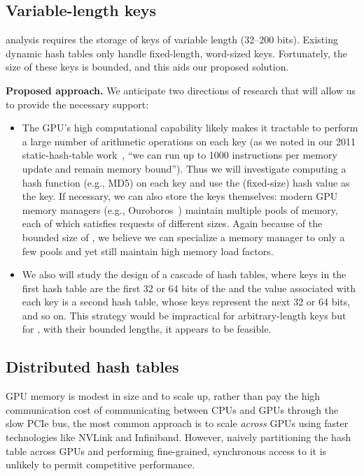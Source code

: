 \subsection{Variable-length keys}

\Kmer analysis requires the storage of \kmer keys of variable length (32--200 bits). Existing dynamic hash tables only handle fixed-length, word-sized keys. Fortunately, the size of these keys is bounded, and this aids our proposed solution.

\noindent
{\bf Proposed approach.}
We anticipate two directions of research that will allow us to provide the necessary support:

\begin{itemize}[noitemsep,nolistsep,leftmargin=*]
  \item The GPU's high computational capability likely makes it tractable to perform a large number of arithmetic operations on each key (as we noted in our 2011 static-hash-table work~\cite{Alcantara:2011:BAE}, ``we can run up to 1000 instructions per memory update and remain memory bound''). Thus we will investigate computing a hash function (e.g., MD5) on each key and use the (fixed-size) hash value as the key. If necessary, we can also store the keys themselves: modern GPU memory managers (e.g., Ouroboros~\cite{Winter:2020:OVQ}) maintain multiple pools of memory, each of which satisfies requests of different sizes. Again because of the bounded size of \kmers, we believe we can specialize a memory manager to only a few pools and yet still maintain high memory load factors.
  \item We also will study the design of a cascade of hash tables, where keys in the first hash table are the first 32 or 64 bits of the \kmer and the value associated with each key is a second hash table, whose keys represent the next 32 or 64 bits, and so on. This strategy would be impractical for arbitrary-length keys but for \kmers, with their bounded lengths, it appears to be feasible.
\end{itemize}

\subsection{Distributed hash tables}

GPU memory is modest in size and to scale up, rather than pay the high communication cost of communicating between CPUs and GPUs through the slow PCIe bus, the most common approach is to scale \emph{across} GPUs using faster technologies like NVLink and Infiniband. However, naively partitioning the hash table across GPUs and performing fine-grained, synchronous access to it is unlikely to permit competitive performance.

